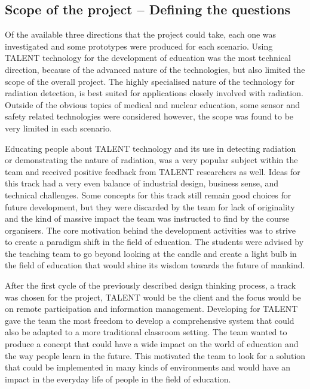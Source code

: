 \documentclass[english,12pt,a4paper,pdftex]{article}
\begin{document}
\subsection{Scope of the project -- Defining the questions}

Of the available three directions that the project could take, each one was investigated and some prototypes were produced for each scenario. Using TALENT technology for the development of education was the most technical direction, because of the advanced nature of the technologies, but also limited the scope of the overall project. The highly specialised nature of the technology for radiation detection, is best suited for applications closely involved with radiation. Outside of the obvious topics of medical and nuclear education, some sensor and safety related technologies were considered however, the scope was found to be very limited in each scenario.

Educating people about TALENT technology and its use in detecting radiation or demonstrating the nature of radiation, was a very popular subject within the team and received positive feedback from TALENT researchers as well. Ideas for this track had a very even balance of industrial design, business sense, and technical challenges. Some concepts for this track still remain good choices for future development, but they were discarded by the team for lack of originality and the kind of massive impact the team was instructed to find by the course organisers. The core motivation behind the development activities was to strive to create a paradigm shift in the field of education. The students were advised by the teaching team to go beyond looking at the candle and create a light bulb in the field of education that would shine its wisdom towards the future of mankind.

After the first cycle of the previously described design thinking process, a track was chosen for the project, TALENT would be the client and the focus would be on remote participation and information management. Developing for TALENT gave the team the most freedom to develop a comprehensive system that could also be adapted to a more traditional classroom setting. The team wanted to produce a concept that could have a wide impact on the world of education and the way people learn in the future. This motivated the team to look for a solution that could be implemented in many kinds of environments and would have an impact in the everyday life of people in the field of education.
\end{document}
